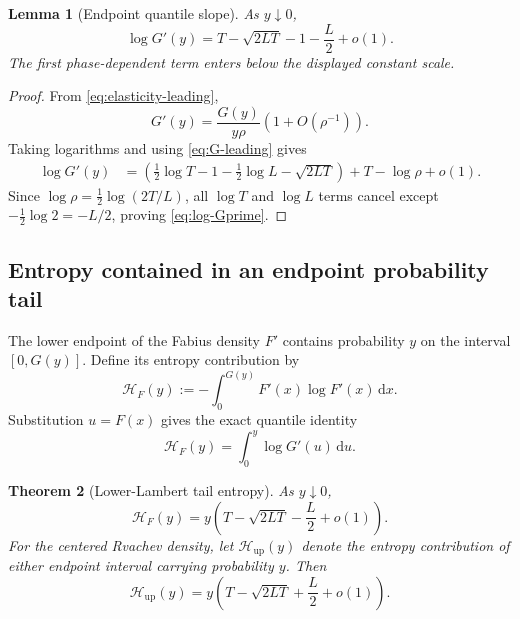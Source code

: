 \documentclass[11pt,oneside]{article}
\newtheorem{theorem}{Theorem}[section]
\newtheorem{lemma}[theorem]{Lemma}
\theoremstyle{definition}
\theoremstyle{remark}
\newcommand{\Up}{\operatorname{up}}
\newcommand{\dd}{\,\mathrm d}
\begin{document}
\begin{lemma}[Endpoint quantile slope]
\label{lem:log-Gprime}
As $y\downarrow0$,
\begin{equation}
 \boxed{
 \log G'(y)
 =T-\sqrt{2LT}-1-\frac L2+o(1).}
 \label{eq:log-Gprime}
\end{equation}
The first phase-dependent term enters below the displayed constant scale.
\end{lemma}

\begin{proof}
From \eqref{eq:elasticity-leading},
\[
 G'(y)=\frac{G(y)}{y\rho}\left(1+O(\rho^{-1})\right).
\]
Taking logarithms and using \eqref{eq:G-leading} gives
\begin{align*}
 \log G'(y)
 &=\left(\frac12\log T-1-\frac12\log L-\sqrt{2LT}\right)
   +T-\log\rho+o(1).
\end{align*}
Since
$\log\rho=\tfrac12\log(2T/L)$, all $\log T$ and $\log L$ terms cancel except
$-\tfrac12\log2=-L/2$, proving \eqref{eq:log-Gprime}.
\end{proof}

\subsection{Entropy contained in an endpoint probability tail}

The lower endpoint of the Fabius density $F'$ contains probability $y$ on the
interval $[0,G(y)]$.  Define its entropy contribution by
\begin{equation}
 \mathscr H_F(y)
 :=-\int_0^{G(y)}F'(x)\log F'(x)\dd x.
 \label{eq:tail-entropy-F-def}
\end{equation}
Substitution $u=F(x)$ gives the exact quantile identity
\begin{equation}
 \mathscr H_F(y)=\int_0^y\log G'(u)\dd u.
 \label{eq:tail-entropy-quantile}
\end{equation}

\begin{theorem}[Lower-Lambert tail entropy]
\label{thm:tail-entropy}
As $y\downarrow0$,
\begin{equation}
 \boxed{
 \mathscr H_F(y)
 =y\left(T-\sqrt{2LT}-\frac L2+o(1)\right).}
 \label{eq:tail-entropy-F}
\end{equation}
For the centered Rvachev density, let $\mathscr H_{\Up}(y)$ denote the entropy
contribution of either endpoint interval carrying probability $y$.  Then
\begin{equation}
 \boxed{
 \mathscr H_{\Up}(y)
 =y\left(T-\sqrt{2LT}+\frac L2+o(1)\right).}
 \label{eq:tail-entropy-up}
\end{equation}
\end{theorem}
\end{document}
